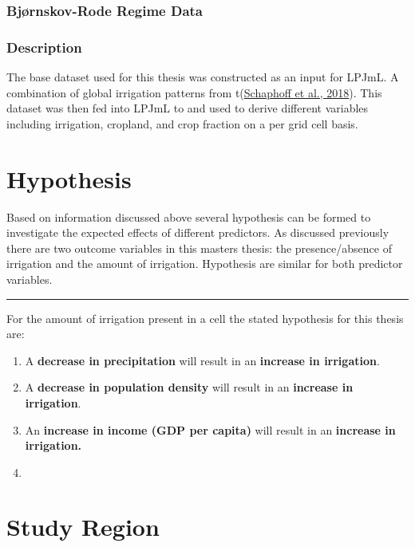 \documentclass[12pt,twoside]{reedthesis}
\providecommand{\tightlist}{%
  \setlength{\itemsep}{0pt}\setlength{\parskip}{0pt}}
\begin{document}
\hypertarget{BRdemo}{%
\subsubsection{Bjørnskov-Rode Regime Data}\label{BRdemo}}

\hypertarget{demodesc}{%
\subsubsection{Description}\label{demodesc}}

The base dataset used for this thesis was constructed as an input for LPJmL. A combination of global irrigation patterns from t(\protect\hyperlink{ref-schaphoffLPJmL4DynamicGlobal2018}{Schaphoff et al., 2018}). This dataset was then fed into LPJmL to and used to derive different variables including irrigation, cropland, and crop fraction on a per grid cell basis.

\hypertarget{hypothesis}{%
\section{Hypothesis}\label{hypothesis}}

Based on information discussed above several hypothesis can be formed to investigate the expected effects of different predictors. As discussed previously there are two outcome variables in this masters thesis: the presence/absence of irrigation and the amount of irrigation. Hypothesis are similar for both predictor variables.
\begin{center}\rule{0.5\linewidth}{0.5pt}\end{center}

For the amount of irrigation present in a cell the stated hypothesis for this thesis are:
\begin{enumerate}
\def\labelenumi{\arabic{enumi}.}
\tightlist
\item
  A \textbf{decrease in precipitation} will result in an \textbf{increase in irrigation}.
\item
  A \textbf{decrease in population density} will result in an \textbf{increase in irrigation}.
\item
  An \textbf{increase in income (GDP per capita)} will result in an \textbf{increase in irrigation.}
\item
\end{enumerate}
\hypertarget{studyreg}{%
\section{Study Region}\label{studyreg}}
\end{document}
